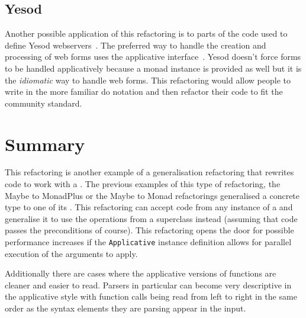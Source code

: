 \subsection{Yesod}
Another possible application of this refactoring is to parts of the code used to define Yesod webservers~\DIFdelbegin {}\DIFdelend \DIFaddbegin {}\DIFaddend . The preferred way to handle the creation and processing of web forms uses the applicative interface~\DIFdelbegin {}\DIFdelend \DIFaddbegin {}\DIFaddend . Yesod doesn't force forms to be handled applicatively because a monad instance is provided as well but it is the \textit{idiomatic} way to handle web forms. This refactoring would allow people to write in the more familiar do notation and then refactor their code to fit the community standard.

\section{Summary}

This refactoring is another example of a generalisation refactoring that rewrites code to work with a \DIFdelbegin {}\DIFdelend \DIFaddbegin {}\DIFaddend . The previous examples of this type of refactoring, the Maybe to MonadPlus or the Maybe to Monad refactorings generalised a concrete type to one of its \DIFdelbegin {}\DIFdelend \DIFaddbegin {}\DIFaddend . This refactoring can accept code from any instance of a \DIFdelbegin {}\DIFdelend \DIFaddbegin {}\DIFaddend and generalise it to use the operations from a superclass instead (assuming that code passes the preconditions of course). This refactoring opens the door for possible performance increases if the \texttt{Applicative} instance definition allows for parallel execution of the arguments to apply.

Additionally there are cases where the applicative versions of functions are cleaner and easier to read. Parsers in particular can become very descriptive in the applicative style with function calls being read from left to right in the same order as the syntax elements they are parsing appear in the input. 

